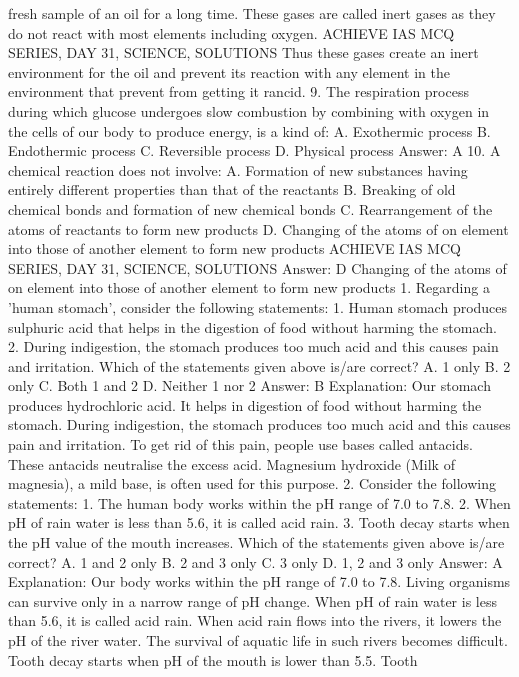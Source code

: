 fresh sample of an oil for a long time. These gases are called inert
gases as they do not react with most elements including oxygen.
ACHIEVE IAS MCQ SERIES, DAY 31, SCIENCE, SOLUTIONS
Thus these gases create an inert environment for the oil and
prevent its reaction with any element in the environment that
prevent from getting it rancid.
9. The respiration process during which glucose undergoes slow
combustion by combining with oxygen in the cells of our body to
produce energy, is a kind of:
A. Exothermic process
B. Endothermic process
C. Reversible process
D. Physical process
Answer: A
10. A chemical reaction does not involve:
A. Formation of new substances having entirely different properties
than that of the reactants
B. Breaking of old chemical bonds and formation of new chemical
bonds
C. Rearrangement of the atoms of reactants to form new products
D. Changing of the atoms of on element into those of another
element to form new products
ACHIEVE IAS MCQ SERIES, DAY 31, SCIENCE, SOLUTIONS
Answer: D
Changing of the atoms of on element into those of another element
to form new products
1. Regarding a 'human stomach', consider the following
statements:
1. Human stomach produces sulphuric acid that helps in the digestion
of food without harming the stomach.
2. During indigestion, the stomach produces too much acid and this
causes pain and irritation.
Which of the statements given above is/are correct?
A. 1 only
B. 2 only
C. Both 1 and 2
D. Neither 1 nor 2
Answer: B
Explanation: Our stomach produces hydrochloric acid. It helps in
digestion of food without harming the stomach. During indigestion,
the stomach produces too much acid and this causes pain and
irritation. To get rid of this pain, people use bases called antacids.
These antacids neutralise the excess acid. Magnesium hydroxide
(Milk of magnesia), a mild base, is often used for this purpose.
2. Consider the following statements:
1. The human body works within the pH range of 7.0 to 7.8.
2. When pH of rain water is less than 5.6, it is called acid rain.
3. Tooth decay starts when the pH value of the mouth increases.
Which of the statements given above is/are correct?
A. 1 and 2 only
B. 2 and 3 only
C. 3 only
D. 1, 2 and 3 only
Answer: A
Explanation: Our body works within the pH range of 7.0 to 7.8.
Living organisms can survive only in a narrow range of pH
change. When pH of rain water is less than 5.6, it is called acid rain.
When acid rain flows into the rivers, it lowers the pH of the river
water. The survival of aquatic life in such rivers becomes difficult.
Tooth decay starts when pH of the mouth is lower than 5.5. Tooth
